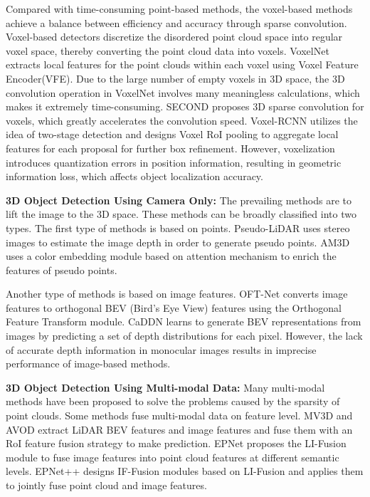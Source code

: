 \begin{sloppypar}
Compared with time-consuming point-based methods, the voxel-based methods achieve a balance between efficiency and accuracy through sparse convolution. Voxel-based detectors discretize the disordered point cloud space into regular voxel space, thereby converting the point cloud data into voxels. VoxelNet\cite{19} extracts local features for the point clouds within each voxel using Voxel Feature Encoder(VFE). Due to the large number of empty voxels in 3D space, the 3D convolution operation in VoxelNet involves many meaningless calculations, which makes it extremely time-consuming. SECOND\cite{20} proposes 3D sparse convolution for voxels, which greatly accelerates the convolution speed. Voxel-RCNN\cite{21} utilizes the idea of two-stage detection and designs Voxel RoI pooling to aggregate local features for each proposal for further box refinement. However, voxelization introduces quantization errors in position information, resulting in geometric information loss, which affects object localization accuracy.

{\bfseries 3D Object Detection Using Camera Only:} The prevailing methods are to lift the image to the 3D space. These methods can be broadly classified into two types. The first type of methods is based on points. Pseudo-LiDAR\cite{22} uses stereo images to estimate the image depth in order to generate pseudo points. AM3D\cite{23} uses a color embedding module based on attention mechanism to enrich the features of pseudo points. 

Another type of methods is based on image features. OFT-Net\cite{24} converts image features to orthogonal BEV (Bird's Eye View) features using the Orthogonal Feature Transform module. CaDDN\cite{25} learns to generate BEV representations from images by predicting a set of depth distributions for each pixel. However, the lack of accurate depth information in monocular images results in imprecise performance of image-based methods.

{\bfseries 3D Object Detection Using Multi-modal Data:} Many multi-modal methods have been proposed to solve the problems caused by the sparsity of point clouds. Some methods fuse multi-modal data on feature level. MV3D\cite{12} and AVOD\cite{13} extract LiDAR BEV features and image features and fuse them with an RoI feature fusion strategy to make prediction. EPNet\cite{26} proposes the LI-Fusion module to fuse image features into point cloud features at different semantic levels. EPNet++\cite{27} designs IF-Fusion modules based on LI-Fusion and applies them to jointly fuse point cloud and image features.


\end{sloppypar}
